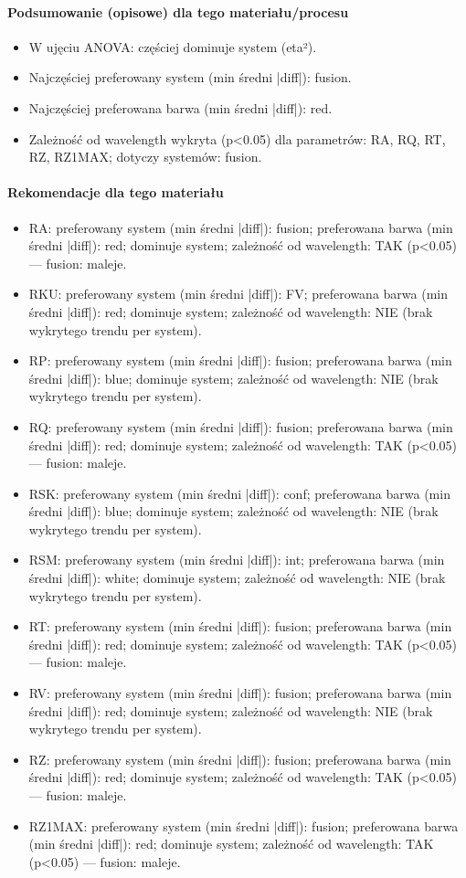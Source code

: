 \documentclass[
  10pt,
]{article}
\begin{document}
\paragraph{Podsumowanie (opisowe) dla tego materiału/procesu}
\begin{itemize}
\item W ujęciu ANOVA: częściej dominuje system (eta²).
\item Najczęściej preferowany system (min średni |diff|): fusion.
\item Najczęściej preferowana barwa (min średni |diff|): red.
\item Zależność od wavelength wykryta (p<0.05) dla parametrów: RA, RQ, RT, RZ, RZ1MAX; dotyczy systemów: fusion.
\end{itemize}
\paragraph{Rekomendacje dla tego materiału}
\begin{itemize}
\item RA: preferowany system (min średni |diff|): fusion; preferowana barwa (min średni |diff|): red; dominuje system; zależność od wavelength: TAK (p<0.05) — fusion: maleje.
\item RKU: preferowany system (min średni |diff|): FV; preferowana barwa (min średni |diff|): red; dominuje system; zależność od wavelength: NIE (brak wykrytego trendu per system).
\item RP: preferowany system (min średni |diff|): fusion; preferowana barwa (min średni |diff|): blue; dominuje system; zależność od wavelength: NIE (brak wykrytego trendu per system).
\item RQ: preferowany system (min średni |diff|): fusion; preferowana barwa (min średni |diff|): red; dominuje system; zależność od wavelength: TAK (p<0.05) — fusion: maleje.
\item RSK: preferowany system (min średni |diff|): conf; preferowana barwa (min średni |diff|): blue; dominuje system; zależność od wavelength: NIE (brak wykrytego trendu per system).
\item RSM: preferowany system (min średni |diff|): int; preferowana barwa (min średni |diff|): white; dominuje system; zależność od wavelength: NIE (brak wykrytego trendu per system).
\item RT: preferowany system (min średni |diff|): fusion; preferowana barwa (min średni |diff|): red; dominuje system; zależność od wavelength: TAK (p<0.05) — fusion: maleje.
\item RV: preferowany system (min średni |diff|): fusion; preferowana barwa (min średni |diff|): red; dominuje system; zależność od wavelength: NIE (brak wykrytego trendu per system).
\item RZ: preferowany system (min średni |diff|): fusion; preferowana barwa (min średni |diff|): red; dominuje system; zależność od wavelength: TAK (p<0.05) — fusion: maleje.
\item RZ1MAX: preferowany system (min średni |diff|): fusion; preferowana barwa (min średni |diff|): red; dominuje system; zależność od wavelength: TAK (p<0.05) — fusion: maleje.
\end{itemize}
\end{document}
